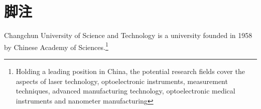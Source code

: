 \section{脚注}
Changchun University of Science and Technology is a university founded in 1958 by Chinese Academy of Sciences.\footnote{Holding a leading position in China, the potential research fields cover the aspects of laser technology, optoelectronic instruments, measurement techniques, advanced manufacturing technology, optoelectronic medical instruments and nanometer manufacturing}
